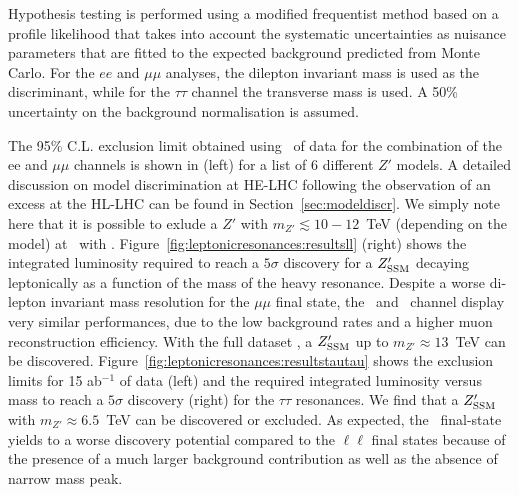 Hypothesis testing is performed using a modified frequentist method based on a profile likelihood that takes into account the systematic uncertainties as nuisance parameters that are fitted to the expected background predicted from Monte Carlo. For the $ee$ and $\mu\mu$ analyses, the dilepton invariant mass is used as the discriminant, while for the $\tau\tau$ channel the transverse mass is used. A 50\% uncertainty on the background normalisation is assumed.

The 95\% C.L. exclusion limit obtained using \intlumihelhc\ of data for the combination of the ee and $\mu\mu$ channels is shown in  (left) for a list of 6 different $Z'$ models. A detailed discussion on model discrimination at HE-LHC following the observation of an excess at the HL-LHC can be found in Section~\ref{sec:modeldiscr}. We simply note here that it is possible to exlude a $Z'$ with $m_{Z'}\lesssim 10-12$~TeV (depending on the model) at \sqrtshelhc\ with \intlumihelhc. Figure~\ref{fig:leptonicresonances:resultsll} (right) shows the integrated luminosity required to reach a $5\sigma$ discovery for a $Z^{\prime}_{\mathrm{SSM}}$ decaying leptonically as a function of the mass of the heavy resonance. Despite a worse di-lepton invariant mass resolution for the $\mu\mu$ final state, the \Zpee\ and \Zpmumu\ channel display very similar performances, due to the low background rates and a higher muon reconstruction efficiency. With the full dataset \intlumihelhc, a $Z^{\prime}_{\mathrm{SSM}}$ up to $m_{Z'}\approx 13$~TeV can be discovered.  Figure~\ref{fig:leptonicresonances:resultstautau} shows the exclusion limits for 15 ab$^{-1}$ of data (left) and the required integrated luminosity
versus mass to reach a $5\sigma$ discovery (right) for the $\tau\tau$ resonances. We find that a $Z^{\prime}_{\mathrm{SSM}}$ with $m_{Z'}\approx 6.5$~TeV can be discovered or excluded. As expected, the \Zptata\ final-state yields to a worse discovery potential compared to the $\ell\ell$ final states because of the presence of a much larger background contribution as well as the absence of narrow mass peak.

